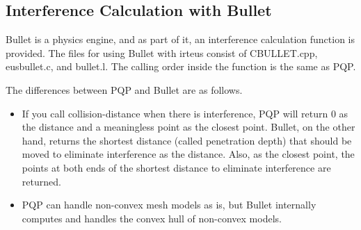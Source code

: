 

\subsection{Interference Calculation with Bullet}

Bullet is a physics engine, and as part of it, an interference calculation function is provided.
The files for using Bullet with irteus consist of CBULLET.cpp, eusbullet.c, and bullet.l.
The calling order inside the function is the same as PQP.

The differences between PQP and Bullet are as follows.
\begin{itemize}
  \item If you call collision-distance when there is interference, PQP will return 0 as the distance and a meaningless point as the closest point. Bullet, on the other hand, returns the shortest distance (called penetration depth) that should be moved to eliminate interference as the distance. Also, as the closest point, the points at both ends of the shortest distance to eliminate interference are returned.
  \item PQP can handle non-convex mesh models as is, but Bullet internally computes and handles the convex hull of non-convex models.
\end{itemize}


